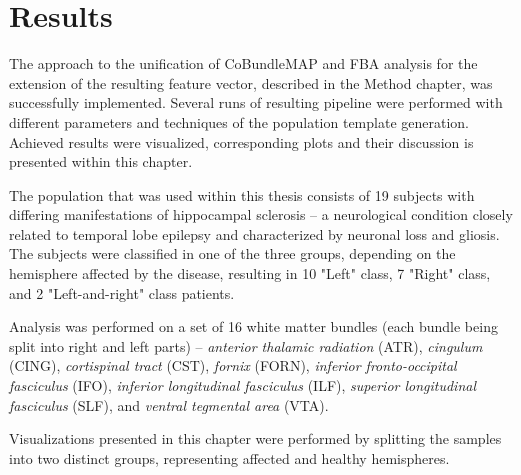 \documentclass[thesis.tex]{subfiles}
\begin{document}
\chapter{Results}
The approach to the unification of CoBundleMAP and FBA analysis for the extension of the resulting feature vector, described in the Method chapter, was successfully implemented. Several runs of resulting pipeline were performed with different parameters and techniques of the population template generation. Achieved results were visualized, corresponding plots and their discussion is presented within this chapter.

The population that was used within this thesis consists of 19 subjects with differing manifestations of hippocampal sclerosis -- a neurological condition closely related to temporal lobe epilepsy and characterized by neuronal loss and gliosis. The subjects were classified in one of the three groups, depending on the hemisphere affected by the disease, resulting in 10 "Left" class, 7 "Right" class, and 2 "Left-and-right" class patients.

Analysis was performed on a set of 16 white matter bundles (each bundle being split into right and left parts) -- \textit{anterior thalamic radiation} (ATR), \textit{cingulum} (CING), \textit{cortispinal tract} (CST), \textit{fornix} (FORN), \textit{inferior fronto-occipital fasciculus} (IFO), \textit{inferior longitudinal fasciculus} (ILF), \textit{superior longitudinal fasciculus} (SLF), and \textit{ventral tegmental area} (VTA).

Visualizations presented in this chapter were performed by splitting the samples into two distinct groups, representing affected and healthy hemispheres.
\end{document}
